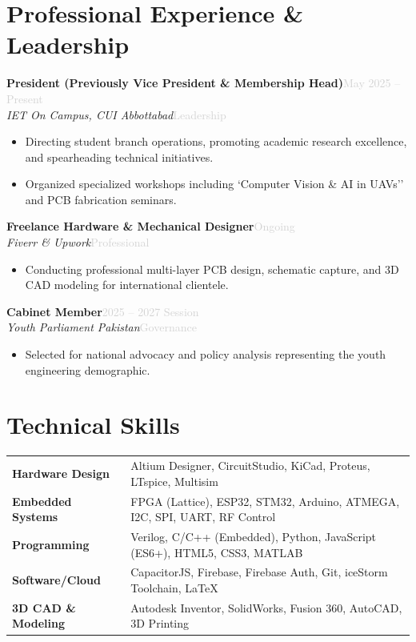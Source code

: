 \documentclass[a4paper,10pt]{article}
\newcommand{\cventry}[4]{%
  {\textbf{#1}}\hfill{\small\textcolor{lightgray}{#2}}\\
  {\textit{#3}}\hfill{\small\textcolor{lightgray}{#4}}\vspace{2pt}
}
\begin{document}
\section{Professional Experience \& Leadership}

\cventry{President (Previously Vice President \& Membership Head)}{May 2025 -- Present}{IET On Campus, CUI Abbottabad}{Leadership}
\begin{itemize}
  \item Directing student branch operations, promoting academic research excellence, and spearheading technical initiatives.
  \item Organized specialized workshops including `Computer Vision \& AI in UAVs'' and PCB fabrication seminars.
\end{itemize}
\vspace{4pt}

\cventry{Freelance Hardware \& Mechanical Designer}{Ongoing}{Fiverr \& Upwork}{Professional}
\begin{itemize}
  \item Conducting professional multi-layer PCB design, schematic capture, and 3D CAD modeling for international clientele.
\end{itemize}
\vspace{4pt}

\cventry{Cabinet Member}{2025 -- 2027 Session}{Youth Parliament Pakistan}{Governance}
\begin{itemize}
  \item Selected for national advocacy and policy analysis representing the youth engineering demographic.
\end{itemize}

\section{Technical Skills}
\begin{tabularx}{\textwidth}{@{} >{\bfseries}l X @{}}
Hardware Design   & Altium Designer, CircuitStudio, KiCad, Proteus, LTspice, Multisim \\[2pt]
Embedded Systems  & FPGA (Lattice), ESP32, STM32, Arduino, ATMEGA, I2C, SPI, UART, RF Control \\[2pt]
Programming       & Verilog, C/C++ (Embedded), Python, JavaScript (ES6+), HTML5, CSS3, MATLAB \\[2pt]
Software/Cloud    & CapacitorJS, Firebase, Firebase Auth, Git, iceStorm Toolchain, LaTeX \\[2pt]
3D CAD \& Modeling & Autodesk Inventor, SolidWorks, Fusion 360, AutoCAD, 3D Printing \\[2pt]
\end{tabularx}
\end{document}
